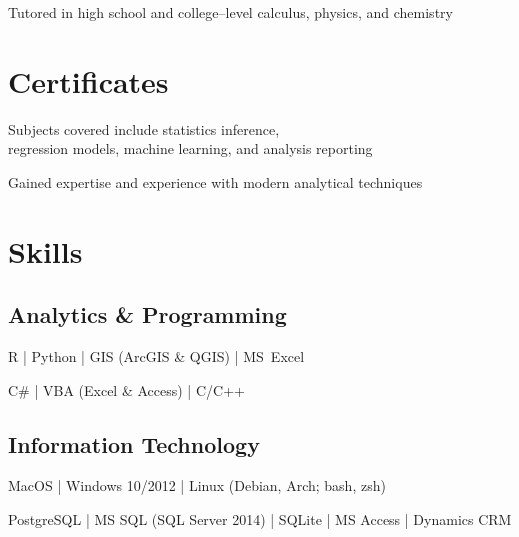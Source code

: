 \documentclass[]{deedy-resume-openfont}
\begin{document}
\begin{minipage}[t]{0.66\textwidth}
 
\begin{tightemize}
\item Tutored in high school and college--level calculus, physics, and chemistry
\end{tightemize}
\sectionsep


\section{Certificates}
\begin{tightemize}
\item Subjects covered include statistics inference,\\regression models, machine learning, and analysis reporting
\item Gained expertise and experience with modern analytical techniques
\end{tightemize}
\sectionsep


\section{Skills}
\subsection{Analytics \& Programming} 
\vspace{\topsep} %
\begin{tightemize}
\item R | Python | GIS (ArcGIS \& QGIS) | \mbox{MS Excel}
\item C\# | VBA (Excel \& Access) | C/C++
\end{tightemize}

\subsection{Information Technology}
\vspace{\topsep} %
\begin{tightemize}
\item MacOS | Windows 10/2012 | Linux (Debian, Arch; bash, zsh)
\item PostgreSQL | MS SQL (SQL Server 2014) | SQLite | MS Access | Dynamics CRM
\end{tightemize}


\end{minipage}
\end{document}
